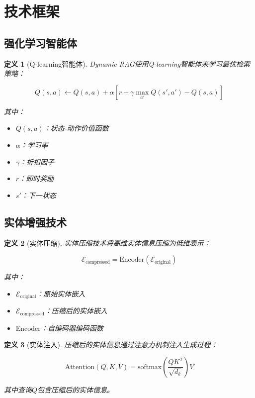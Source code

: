 \documentclass{ctexart}
\newtheorem{definition}{定义}
\begin{document}
\section{技术框架}

\subsection{强化学习智能体}

\begin{definition}[Q-learning智能体]
Dynamic RAG使用Q-learning智能体来学习最优检索策略：

$$Q(s, a) \leftarrow Q(s, a) + \alpha[r + \gamma \max_{a'} Q(s', a') - Q(s, a)]$$

其中：
\begin{itemize}
    \item $Q(s, a)$：状态-动作价值函数
    \item $\alpha$：学习率
    \item $\gamma$：折扣因子
    \item $r$：即时奖励
    \item $s'$：下一状态
\end{itemize}
\end{definition}

\subsection{实体增强技术}

\begin{definition}[实体压缩]
实体压缩技术将高维实体信息压缩为低维表示：

$$\mathcal{E}_{\text{compressed}} = \text{Encoder}(\mathcal{E}_{\text{original}})$$

其中：
\begin{itemize}
    \item $\mathcal{E}_{\text{original}}$：原始实体嵌入
    \item $\mathcal{E}_{\text{compressed}}$：压缩后的实体嵌入
    \item $\text{Encoder}$：自编码器编码函数
\end{itemize}
\end{definition}

\begin{definition}[实体注入]
压缩后的实体信息通过注意力机制注入生成过程：

$$\text{Attention}(Q, K, V) = \text{softmax}\left(\frac{QK^T}{\sqrt{d_k}}\right)V$$

其中查询$Q$包含压缩后的实体信息。
\end{definition}
\end{document}
